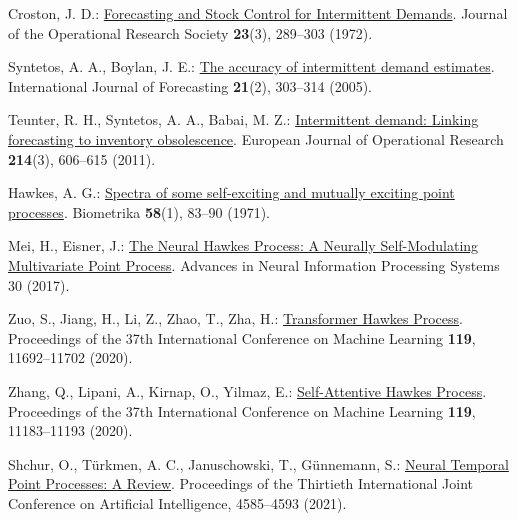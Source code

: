 
Croston, J. D.: \href{https://link.springer.com/article/10.1057/jors.1972.50}{Forecasting and Stock Control for Intermittent Demands}. Journal of the Operational Research Society \textbf{23}(3), 289--303 (1972). 

Syntetos, A. A., Boylan, J. E.: \href{https://www.sciencedirect.com/science/article/pii/S0169207004000792}{The accuracy of intermittent demand estimates}. International Journal of Forecasting \textbf{21}(2), 303--314 (2005). 

Teunter, R. H., Syntetos, A. A., Babai, M. Z.: \href{https://www.sciencedirect.com/science/article/pii/S0377221711004437}{Intermittent demand: Linking forecasting to inventory obsolescence}. European Journal of Operational Research \textbf{214}(3), 606--615 (2011). 

Hawkes, A. G.: \href{https://academic.oup.com/biomet/article-abstract/58/1/83/224809}{Spectra of some self-exciting and mutually exciting point processes}. Biometrika \textbf{58}(1), 83--90 (1971). 

Mei, H., Eisner, J.: \href{https://papers.nips.cc/paper_files/paper/2017/hash/6463c88460bd63bbe256e495c63aa40b-Abstract.html}{The Neural Hawkes Process: A Neurally Self-Modulating Multivariate Point Process}. Advances in Neural Information Processing Systems 30 (2017).

Zuo, S., Jiang, H., Li, Z., Zhao, T., Zha, H.: \href{https://proceedings.mlr.press/v119/zuo20a.html}{Transformer Hawkes Process}. Proceedings of the 37th International Conference on Machine Learning \textbf{119}, 11692--11702 (2020).

Zhang, Q., Lipani, A., Kirnap, O., Yilmaz, E.: \href{https://proceedings.mlr.press/v119/zhang20q.html}{Self-Attentive Hawkes Process}. Proceedings of the 37th International Conference on Machine Learning \textbf{119}, 11183--11193 (2020).

Shchur, O., T\"{u}rkmen, A. C., Januschowski, T., G\"{u}nnemann, S.: \href{https://www.ijcai.org/proceedings/2021/623}{Neural Temporal Point Processes: A Review}. Proceedings of the Thirtieth International Joint Conference on Artificial Intelligence, 4585--4593 (2021). 


